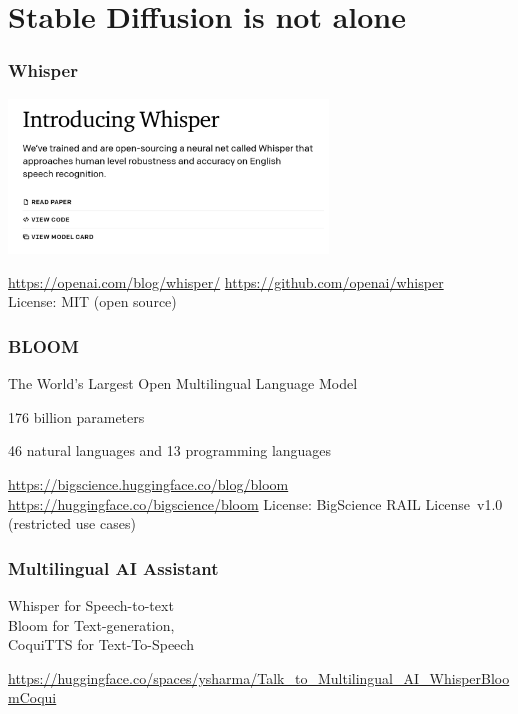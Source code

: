 \documentclass[17pt,aspectratio=169,hyperref={pdfusetitle,colorlinks,allcolors=olive}]{beamer}
\begin{document}
\section{Stable Diffusion is not alone}

\begin{frame}[fragile]
  \frametitle{Whisper}

  \includegraphics[width=8.5cm]{figs/whisper}

  \begin{flushright}
    {\scriptsize
    \url{https://openai.com/blog/whisper/}
    \url{https://github.com/openai/whisper} \\
    License: MIT (open source) \\
  }
  \end{flushright}

\end{frame}

\begin{frame}[fragile]
  \frametitle{BLOOM}

  The World’s Largest Open Multilingual Language Model  

  176 billion parameters

  46 natural languages and 13 programming languages

  \begin{flushright}
    \url{https://bigscience.huggingface.co/blog/bloom} \\
    \url{https://huggingface.co/bigscience/bloom}
    License: BigScience RAIL License v1.0 (restricted use cases) \\
  \end{flushright}

\end{frame}

\begin{frame}[fragile]
  \frametitle{Multilingual AI Assistant}

   Whisper for Speech-to-text  \\
   Bloom for Text-generation, \\
   CoquiTTS for Text-To-Speech \\
  
  \begin{flushright}
    {\scriptsize
      \url{https://huggingface.co/spaces/ysharma/Talk_to_Multilingual_AI_WhisperBloomCoqui} \\
    }
  \end{flushright}

\end{frame}
\end{document}

